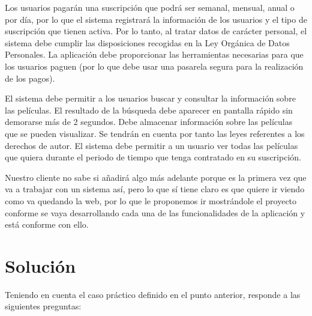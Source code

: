Los usuarios pagarán una suscripción que podrá ser semanal, mensual, anual o por día, por lo que el sistema registrará la información de los usuarios y el tipo de suscripción que tienen activa. Por lo tanto, al tratar datos de carácter personal, el sistema debe cumplir las disposiciones recogidas en la Ley Orgánica de Datos Personales. La aplicación debe proporcionar las herramientas necesarias para que los usuarios paguen (por lo que debe usar una pasarela segura para la realización de los pagos).

El sistema debe permitir a los usuarios buscar y consultar la información sobre las películas. El resultado de la búsqueda debe aparecer en pantalla rápido sin demorarse más de 2 segundos. Debe almacenar información sobre las películas que se pueden visualizar. Se tendrán en cuenta por tanto las leyes referentes a los derechos de autor.  El sistema debe permitir a un usuario ver todas las películas que quiera durante el periodo de tiempo que tenga contratado en su suscripción.

Nuestro cliente no sabe si añadirá algo más adelante porque es la primera vez que va a trabajar con un sistema así, pero lo que sí tiene claro es que quiere ir viendo como va quedando la web, por lo que le proponemos ir mostrándole el proyecto conforme se vaya desarrollando cada una de las funcionalidades de la aplicación y está conforme con ello.

\section{Solución}
Teniendo en cuenta el caso práctico definido en el punto anterior, responde a las siguientes preguntas:

